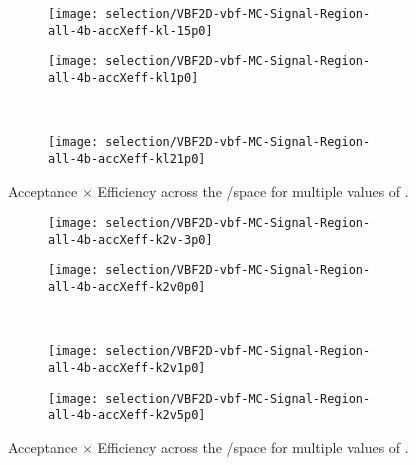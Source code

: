         \begin{figure}[tbh]
            \begin{subfigure}{0.48\textwidth}
                \texttt{[image: selection/VBF2D-vbf-MC-Signal-Region-all-4b-accXeff-kl-15p0]}
                \caption{}
            \end{subfigure}
            \begin{subfigure}{0.48\textwidth}
                \texttt{[image: selection/VBF2D-vbf-MC-Signal-Region-all-4b-accXeff-kl1p0]}
                \caption{}
            \end{subfigure}\\
            \begin{subfigure}{0.48\textwidth}
                \texttt{[image: selection/VBF2D-vbf-MC-Signal-Region-all-4b-accXeff-kl21p0]}
                \caption{}
            \end{subfigure}
            \caption{
                Acceptance $\times$ Efficiency across the \kvv/\kv space for multiple values of \kl.
            }
            \label{fig:accXeff_kl}
        \end{figure}

        \begin{figure}[tbh]
            \begin{subfigure}{0.48\textwidth}
                \texttt{[image: selection/VBF2D-vbf-MC-Signal-Region-all-4b-accXeff-k2v-3p0]}
                \caption{}
            \end{subfigure}
            \begin{subfigure}{0.48\textwidth}
                \texttt{[image: selection/VBF2D-vbf-MC-Signal-Region-all-4b-accXeff-k2v0p0]}
                \caption{}
            \end{subfigure}\\
            \begin{subfigure}{0.48\textwidth}
                \texttt{[image: selection/VBF2D-vbf-MC-Signal-Region-all-4b-accXeff-k2v1p0]}
                \caption{}
            \end{subfigure}
            \begin{subfigure}{0.48\textwidth}
                \texttt{[image: selection/VBF2D-vbf-MC-Signal-Region-all-4b-accXeff-k2v5p0]}
                \caption{}
            \end{subfigure}
            \caption{
                Acceptance $\times$ Efficiency across the \kl/\kv space for multiple values of \kvv.
            }
            \label{fig:accXeff_kvv}
        \end{figure}

            


